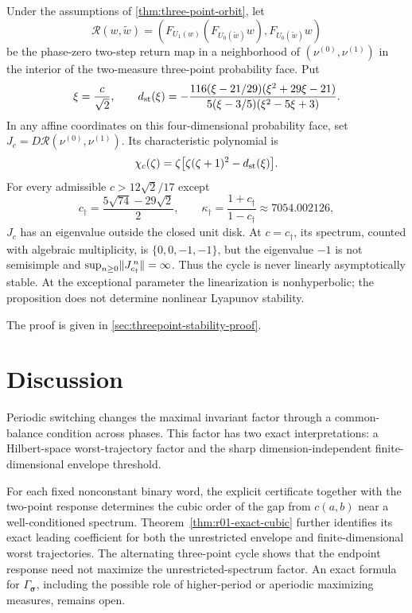 \documentclass[letterpaper,twoside]{article}
\begin{document}
\begin{proposition}
\label{prop:three-point-stability}
Under the assumptions of \mbox{\cref{thm:three-point-orbit}}, let
\[
 \mathcal R(w,\widetilde w)=
 \left(F_{U_1(w)}\!\left(F_{U_0(\widetilde w)}w\right),
 F_{U_0(\widetilde w)}w\right)
\]
be the phase-zero two-step return map in a neighborhood of
$(\nu^{(0)},\nu^{(1)})$ in the interior of the two-measure three-point
probability face.  Put
\[
 \xi=\frac{c}{\sqrt2},
 \qquad
 d_{\rm st}(\xi)=
 -\frac{116(\xi-21/29)(\xi^2+29\xi-21)}
 {5(\xi-3/5)(\xi^2-5\xi+3)}.
\]
In any affine coordinates on this four-dimensional probability face, set
$J_c=D\mathcal R(\nu^{(0)},\nu^{(1)})$.  Its characteristic polynomial is
\begin{equation}\label{eq:three-point-stability-poly}
 \chi_c(\zeta)=
 \zeta\bigl[\zeta(\zeta+1)^2-d_{\rm st}(\xi)\bigr].
\end{equation}
For every admissible $c>12\sqrt2/17$ except
\begin{equation}\label{eq:three-point-exceptional-c}
 c_\dagger=
 \frac{5\sqrt{74}-29\sqrt2}{2},
 \qquad
 \kappa_\dagger=\frac{1+c_\dagger}{1-c_\dagger}
 \approx7054.002126,
\end{equation}
$J_c$ has an eigenvalue outside the closed unit disk.  At $c=c_\dagger$,
its spectrum, counted with algebraic multiplicity, is $\{0,0,-1,-1\}$,
but the eigenvalue $-1$ is not semisimple and
$\sup_{n\ge0}\lVert J_{c_\dagger}^{\,n}\rVert=\infty$.  Thus the cycle is never
linearly asymptotically stable.  At the exceptional parameter the
linearization is nonhyperbolic; the proposition does not determine nonlinear
Lyapunov stability.
\end{proposition}

The proof is given in \cref{sec:threepoint-stability-proof}.


\section{Discussion}\label{sec:discussion}

Periodic switching changes the maximal invariant factor through a
common-balance condition across phases.  This factor has two exact
interpretations: a Hilbert-space worst-trajectory factor and the sharp
dimension-independent finite-dimensional envelope threshold.

For each fixed nonconstant binary word, the explicit certificate together
with the two-point response determines the cubic order of the gap from $c(a,b)$ near a well-conditioned spectrum. Theorem~\ref{thm:r01-exact-cubic} further identifies its exact leading coefficient for both the unrestricted envelope and finite-dimensional worst trajectories.  The alternating three-point cycle
shows that the endpoint response need not maximize the unrestricted-spectrum
factor.  An exact formula for $\Gamma_{\bm\sigma}$, including the possible role
of higher-period or aperiodic maximizing measures, remains open.
\end{document}
